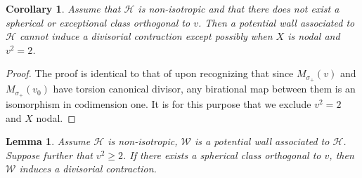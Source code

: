 \documentclass[leqno,11pt]{amsart}
\newtheorem{Lem}[Thm]{Lemma}
\newtheorem{Cor}[Thm]{Corollary}
\theoremstyle{definition}
\def\HH{\ensuremath{\mathcal H}}
\def\WW{\ensuremath{\mathcal W}}
\begin{document}
\begin{Cor}
Assume that $\HH$ is non-isotropic and that there does not exist a spherical or exceptional class orthogonal to $v$.  Then a potential wall associated to $\HH$ cannot induce a divisorial contraction except possibly when $X$ is nodal and $v^2=2$.  
\end{Cor}
\begin{proof}
The proof is identical to that of \cite[Corollary 7.3]{BM14b} upon recognizing that since $M_{\sigma_+}(v)$ and $M_{\sigma_+}(v_0)$ have torsion canonical divisor, any birational map between them is an isomorphism in codimension one.  It is for this purpose that we exclude $v^2=2$ and $X$ nodal.  
\end{proof}

\begin{Lem}
Assume $\HH$ is non-isotropic, $\WW$ is a potential wall associated to $\HH$.  Suppose further that $v^2\geq 2$.  If there exists a spherical class orthogonal to $v$, then $\WW$ induces a divisorial contraction.  
\end{Lem}
\end{document}
